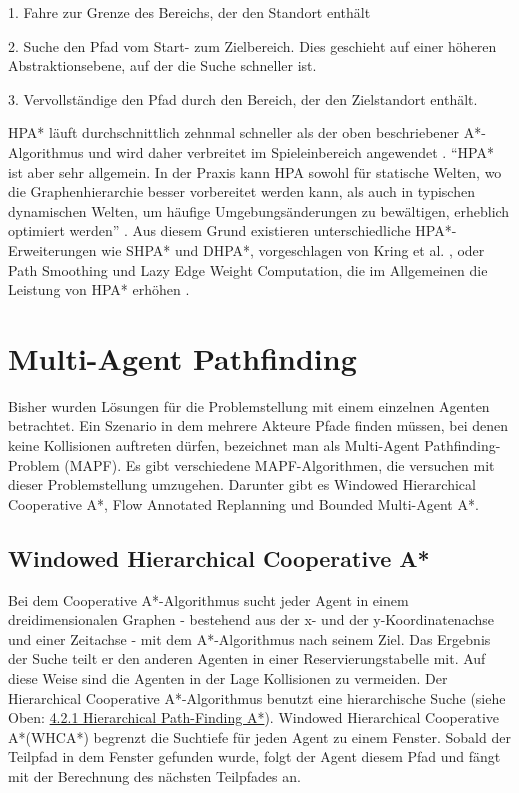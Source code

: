 1. Fahre zur Grenze des Bereichs, der den Standort enthält

2. Suche den Pfad vom Start- zum Zielbereich. Dies geschieht auf einer höheren Abstraktionsebene, auf der die Suche schneller ist.

3. Vervollständige den Pfad durch den Bereich, der den Zielstandort enthält.\\

\begin{sloppypar}
HPA* läuft durchschnittlich zehnmal schneller als der oben beschriebener A*-Algorithmus \cite[S. 1, 26]{Bot04} und wird daher verbreitet im Spieleinbereich angewendet \cite{LSC08}. ``HPA* ist aber sehr allgemein. In der Praxis kann HPA sowohl für statische Welten, wo die Graphenhierarchie besser vorbereitet werden kann, als auch in typischen dynamischen Welten, um häufige Umgebungsänderungen zu bewältigen, erheblich optimiert werden'' \cite[S. 39]{Kri10}. Aus diesem Grund existieren unterschiedliche HPA*-Erweiterungen wie SHPA* und DHPA*, vorgeschlagen von Kring et al. \cite[40-43]{Kri10}, oder Path Smoothing und Lazy Edge Weight Computation, die im Allgemeinen die Leistung von HPA* erhöhen \cite{JB07}.
\end{sloppypar}



\section{Multi-Agent Pathfinding}
Bisher wurden Lösungen für die Problemstellung mit einem einzelnen Agenten betrachtet. Ein Szenario in dem mehrere Akteure Pfade finden müssen, bei denen keine Kollisionen auftreten dürfen, bezeichnet man als Multi-Agent Pathfinding-Problem (MAPF). Es gibt verschiedene MAPF-Algorithmen, die versuchen mit dieser Problemstellung umzugehen. Darunter gibt es Windowed Hierarchical Cooperative A*, Flow Annotated Replanning und Bounded Multi-Agent A*.

\subsection{Windowed Hierarchical Cooperative A*}
Bei dem Cooperative A*-Algorithmus sucht jeder Agent in einem dreidimensionalen Graphen - bestehend aus der x- und der y-Koordinatenachse und einer Zeitachse - mit dem A*-Algorithmus nach seinem Ziel. 
Das Ergebnis der Suche teilt er den anderen Agenten in einer Reservierungstabelle mit. Auf diese Weise sind die Agenten in der Lage Kollisionen zu vermeiden. 
Der Hierarchical Cooperative A*-Algorithmus benutzt eine hierarchische Suche (siehe Oben: \hyperref[sec:hpa]{4.2.1 Hierarchical Path-Finding A*}). Windowed Hierarchical Cooperative A*(WHCA*) begrenzt die Suchtiefe für jeden Agent zu einem Fenster. Sobald der Teilpfad in dem Fenster gefunden wurde, folgt der Agent diesem Pfad und fängt mit der Berechnung des nächsten Teilpfades an.

